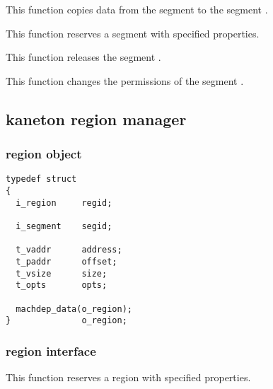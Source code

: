 	 {
	   This function copies data from the segment  to
	   the segment .
	 }

	 {
	   This function reserves a segment with specified properties.
	 }

	 {
	   This function releases the segment .
	 }

	 {
	   This function changes the permissions of the segment .
	 }

\subsection{kaneton region manager}

\subsubsection{region object}

\begin{verbatim}
typedef struct
{
  i_region     regid;

  i_segment    segid;

  t_vaddr      address;
  t_paddr      offset;
  t_vsize      size;
  t_opts       opts;

  machdep_data(o_region);
}              o_region;
\end{verbatim}

\subsubsection{region interface}

	 {
	   This function reserves a region with specified properties.
	 }

